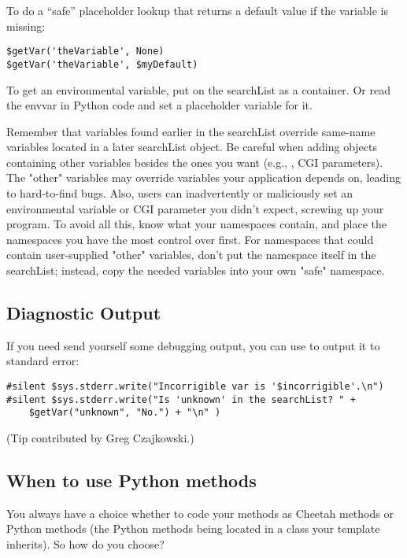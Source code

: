 To do a ``safe'' placeholder lookup that returns a default value if the
variable is missing:
\begin{verbatim}
$getVar('theVariable', None)
$getVar('theVariable', $myDefault)
\end{verbatim}

To get an environmental variable, put  on the searchList as a
container.  Or read the envvar in Python code and set a placeholder variable
for it.

Remember that variables found earlier in the searchList override same-name
variables located in a later searchList object.  Be careful when adding objects
containing other variables besides the ones you want (e.g., ,
CGI parameters).  The "other" variables may override variables your application
depends on, leading to hard-to-find bugs.  Also, users can inadvertently or
maliciously set an environmental variable or CGI parameter you didn't expect,
screwing up your program.  To avoid all this, know what your namespaces
contain, and place the namespaces you have the most control over first.  For
namespaces that could contain user-supplied "other" variables, don't put the
namespace itself in the searchList; instead, copy the needed variables into
your own "safe" namespace.

\subsection{Diagnostic Output}
\label{tips.diagnostic}

If you need send yourself some debugging output, you can use  to
output it to standard error:
\begin{verbatim}
#silent $sys.stderr.write("Incorrigible var is '$incorrigible'.\n")
#silent $sys.stderr.write("Is 'unknown' in the searchList? " +
    $getVar("unknown", "No.") + "\n" )
\end{verbatim}
(Tip contributed by Greg Czajkowski.)

\subsection{When to use Python methods}
\label{tips.pythonMethods}

You always have a choice whether to code your methods as Cheetah 
methods or Python methods (the Python methods being located in a class your
template inherits).  So how do you choose?

